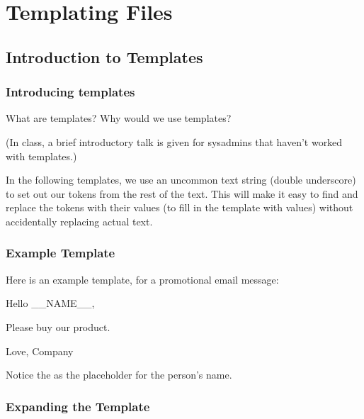 



\chapter{Templating Files}





\section{Introduction to Templates}





\subsection{Introducing templates}

What are templates?  Why would we use templates?

(In class, a brief introductory talk is given for sysadmins that haven't
worked with templates.)

In the following templates, we use an uncommon text string (double
underscore) to set out our tokens from the rest of the text. This will
make it easy to find and replace the tokens with their values (to fill
in the template with values) without accidentally replacing actual text.





\subsection{Example Template}

Here is an example template, for a promotional email message:

\begin{code}
Hello __NAME__,

  Please buy our product.

Love,
Company
\end{code}

Notice the  as the placeholder for the person's name.





\subsection{Expanding the Template}

